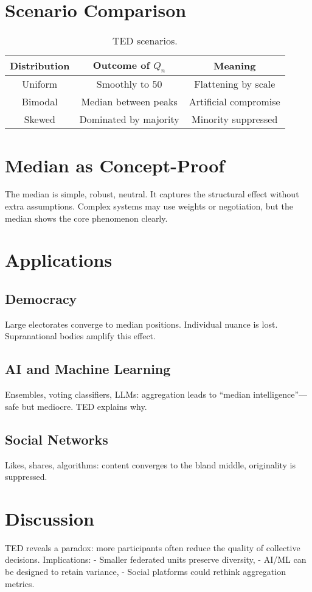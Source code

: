 \documentclass[12pt]{article}
\begin{document}
\section{Scenario Comparison}
\begin{table}[h]
\centering
\begin{tabular}{|c|c|c|}
\hline
Distribution & Outcome of $Q_n$ & Meaning \\
\hline
Uniform & Smoothly to 50 & Flattening by scale \\
Bimodal & Median between peaks & Artificial compromise \\
Skewed & Dominated by majority & Minority suppressed \\
\hline
\end{tabular}
\caption{TED scenarios.}
\end{table}

\section{Median as Concept-Proof}
The median is simple, robust, neutral. It captures the structural 
effect without extra assumptions. Complex systems may use weights 
or negotiation, but the median shows the core phenomenon clearly.

\section{Applications}
\subsection{Democracy}
Large electorates converge to median positions. Individual nuance 
is lost. Supranational bodies amplify this effect.

\subsection{AI and Machine Learning}
Ensembles, voting classifiers, LLMs: aggregation leads to “median 
intelligence”—safe but mediocre. TED explains why.

\subsection{Social Networks}
Likes, shares, algorithms: content converges to the bland middle, 
originality is suppressed.

\section{Discussion}
TED reveals a paradox: more participants often reduce the 
quality of collective decisions. Implications:  
- Smaller federated units preserve diversity,  
- AI/ML can be designed to retain variance,  
- Social platforms could rethink aggregation metrics.
\end{document}
